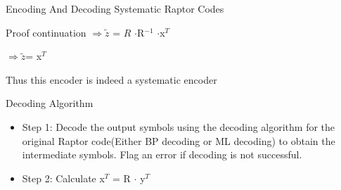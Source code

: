 \documentclass[handout,11pt]{beamer}
\begin{document}
\begin{frame}{Encoding And Decoding Systematic Raptor Codes}
\begin{block}{Proof continuation}
$\Rightarrow \tilde{z}$ = $R$ $\cdot$R$^{-1}$ $\cdot$x$^{T}$

$\Rightarrow \tilde{z}$= x$^{T}$
\end{block}
Thus this encoder is indeed a systematic encoder

\begin{block}{Decoding Algorithm}
  \begin{itemize}

\item Step 1: Decode the output symbols using the decoding algorithm
for the original Raptor code(Either BP decoding or ML decoding) to obtain the intermediate symbols. Flag an error if decoding is not successful.

\item Step 2: Calculate x$^T$ = R $\cdot$ y$^T$

\end{itemize}
\end{block}
\end{frame}
\end{document}
